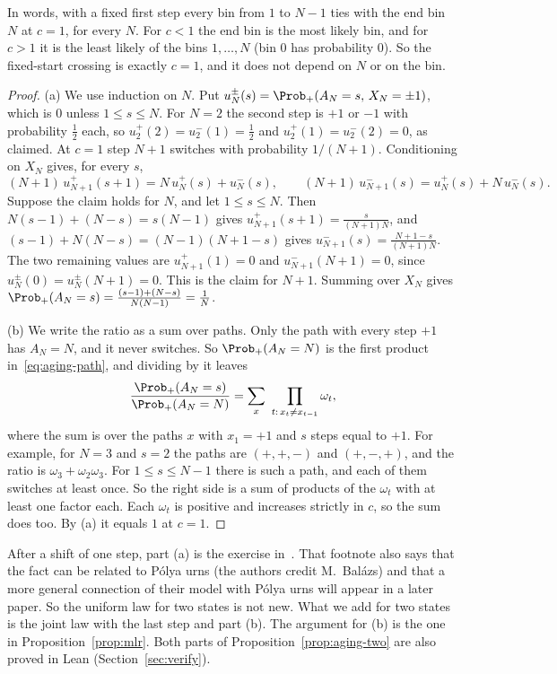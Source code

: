 In words, with a fixed first step every bin from $1$ to $N-1$ ties with the
end bin $N$ at $c=1$, for every $N$. For $c<1$ the end bin is the most likely
bin, and for $c>1$ it is the least likely of the bins $1,\dots,N$ (bin $0$
has probability $0$). So the fixed-start crossing is exactly $c=1$, and it
does not depend on $N$ or on the bin.

\begin{proof}
(a) We use induction on $N$. Put $u^\pm_N(s)=\Prob_+(A_N=s,\,X_N=\pm1)$, which
is $0$ unless $1\le s\le N$. For $N=2$ the second step is $+1$ or $-1$ with
probability $\frac12$ each, so $u^+_2(2)=u^-_2(1)=\frac12$ and
$u^+_2(1)=u^-_2(2)=0$, as claimed. At $c=1$ step $N+1$ switches with
probability $1/(N+1)$. Conditioning on $X_N$ gives, for every $s$,
\[
 (N+1)\,u^+_{N+1}(s+1)=N\,u^+_N(s)+u^-_N(s),\qquad
 (N+1)\,u^-_{N+1}(s)=u^+_N(s)+N\,u^-_N(s).
\]
Suppose the claim holds for $N$, and let $1\le s\le N$. Then
$N(s-1)+(N-s)=s(N-1)$ gives $u^+_{N+1}(s+1)=\frac{s}{(N+1)N}$, and
$(s-1)+N(N-s)=(N-1)(N+1-s)$ gives $u^-_{N+1}(s)=\frac{N+1-s}{(N+1)N}$. The
two remaining values are $u^+_{N+1}(1)=0$ and $u^-_{N+1}(N+1)=0$, since
$u^\pm_N(0)=u^\pm_N(N+1)=0$. This is the claim for $N+1$. Summing over $X_N$
gives $\Prob_+(A_N=s)=\frac{(s-1)+(N-s)}{N(N-1)}=\frac1N$.

(b) We write the ratio as a sum over paths. Only the path with every step
$+1$ has $A_N=N$, and it never switches. So $\Prob_+(A_N=N)$ is the first
product in~\eqref{eq:aging-path}, and dividing by it leaves
\begin{equation}\label{eq:aging-ratio}
 \frac{\Prob_+(A_N=s)}{\Prob_+(A_N=N)}
 =\sum_{x}\ \prod_{t:\,x_t\ne x_{t-1}}\omega_t ,
\end{equation}
where the sum is over the paths $x$ with $x_1=+1$ and $s$ steps equal to
$+1$. For example, for $N=3$ and $s=2$ the paths are $(+,+,-)$ and $(+,-,+)$,
and the ratio is $\omega_3+\omega_2\omega_3$. For $1\le s\le N-1$ there is
such a path, and each of them switches at least once. So the right side is a
sum of products of the $\omega_t$ with at least one factor each. Each
$\omega_t$ is positive and increases strictly in $c$, so the sum does too. By
(a) it equals $1$ at $c=1$.
\end{proof}

After a shift of one step, part (a) is the exercise
in~\cite[footnote~1 on p.~6]{evw2020}. That footnote also says that the fact
can be related to P\'olya urns (the authors credit M.~Bal\'azs) and that a
more general connection of their model with P\'olya urns will appear in a
later paper. So the uniform law for two states is not new. What we add for
two states is the joint law with the last step and part (b). The argument for
(b) is the one in
Proposition~\ref{prop:mlr}. Both parts of
Proposition~\ref{prop:aging-two} are also proved in Lean
(Section~\ref{sec:verify}).

